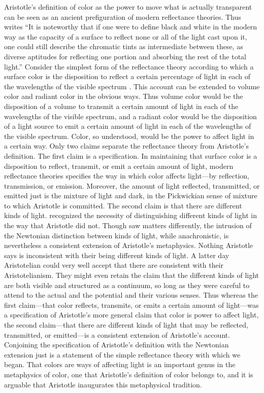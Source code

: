 Aristotle's definition of color as the power to move what is actually transparent can be seen as an ancient prefiguration of modern reflectance theories. Thus \citet[23]{Ross:1906fk} writes ``It is noteworthy that if one were to define black and white in the modern way as the capacity of a surface to reflect none or all of the light cast upon it, one could still describe the chromatic tints as intermediate between these, as diverse aptitudes for reflecting one portion and absorbing the rest of the total light.'' Consider the simplest form of the reflectance theory according to which a surface color is the disposition to reflect a certain percentage of light in each of the wavelengths of the visible spectrum \citep[see][]{Hilbert:1987jq}. This account can be extended to volume color and radiant color in the obvious ways. Thus volume color would be the disposition of a volume to transmit a certain amount of light in each of the wavelengths of the visible spectrum, and a radiant color would be the disposition of a light source to emit a certain amount of light in each of the wavelengths of the visible spectrum. Color, so understood, would be the power to affect light in a certain way. Only two claims separate the reflectance theory from Aristotle's definition. The first claim is a specification. In maintaining that surface color is a disposition to reflect, transmit, or emit a certain amount of light, modern reflectance theories specifies the way in which color affects light---by reflection, transmission, or emission. Moreover, the amount of light reflected, transmitted, or emitted just is the mixture of light and dark, in the Pickwickian sense of mixture to which Aristotle is committed. The second claim is that there are different kinds of light. \citet{Newton:1704qv} recognized the necessity of distinguishing different kinds of light in the way that Aristotle did not. Though \citet{Goethe:1810uq} saw matters differently, the intrusion of the Newtonian distinction between kinds of light, while anachronistic, is nevertheless a consistent extension of Aristotle's metaphysics. Nothing Aristotle says is inconsistent with their being different kinds of light. A latter day Aristotelian could very well accept that there are consistent with their Aristotelianism. They might even retain the claim that the different kinds of light are both visible and structured as a continuum, so long as they were careful to attend to the actual and the potential and their various senses. Thus whereas the first claim---that color reflects, transmits, or emits a certain amount of light---was a specification of Aristotle's more general claim that color is power to affect light, the second claim---that there are different kinds of light that may be reflected, transmitted, or emitted---is a consistent extension of Aristotle's account. Conjoining the specification of Aristotle's definition with the Newtonian extension just is a statement of the simple reflectance theory with which we began. That colors are ways of affecting light is an important genus in the metaphysics of color, one that Aristotle's definition of color belongs to, and it is arguable that Aristotle inaugurates this metaphysical tradition.

